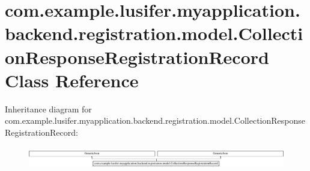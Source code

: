 \hypertarget{classcom_1_1example_1_1lusifer_1_1myapplication_1_1backend_1_1registration_1_1model_1_1_collection_response_registration_record}{}\section{com.\+example.\+lusifer.\+myapplication.\+backend.\+registration.\+model.\+Collection\+Response\+Registration\+Record Class Reference}
\label{classcom_1_1example_1_1lusifer_1_1myapplication_1_1backend_1_1registration_1_1model_1_1_collection_response_registration_record}
Inheritance diagram for com.\+example.\+lusifer.\+myapplication.\+backend.\+registration.\+model.\+Collection\+Response\+Registration\+Record\+:\begin{figure}[H]
\begin{center}
\leavevmode
\includegraphics[height=0.947547cm]{classcom_1_1example_1_1lusifer_1_1myapplication_1_1backend_1_1registration_1_1model_1_1_collection_response_registration_record}
\end{center}
\end{figure}
